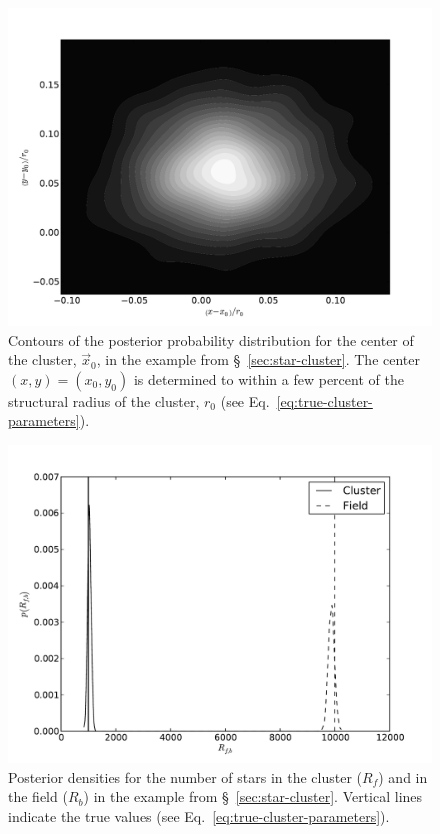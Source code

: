 \documentclass[aps,prd]{revtex4-1}
\begin{document}
\begin{figure}
  \includegraphics[width=\columnwidth]{sky_location}
  \caption{\label{fig:sky-loc} Contours of the posterior probability
    distribution for the center of the cluster, $\vec{x}_0$, in the
    example from \S~\ref{sec:star-cluster}.  The center $(x,y) =
    \left(x_0, y_0\right)$ is determined to within a few percent of
    the structural radius of the cluster, $r_0$ (see
    Eq.~\eqref{eq:true-cluster-parameters}).}
\end{figure}

\begin{figure}
  \includegraphics[width=\columnwidth]{numbers}
  \caption{\label{fig:cluster-number} Posterior densities for the
    number of stars in the cluster ($R_f$) and in the field ($R_b$) in
    the example from \S~\ref{sec:star-cluster}.  Vertical lines
    indicate the true values (see
    Eq.~\eqref{eq:true-cluster-parameters}). }
\end{figure}
\end{document}

